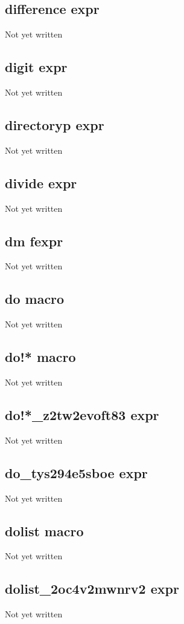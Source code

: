 \documentclass[a4paper,11pt]{article}
\begin{document}
\subsection{\ttfamily difference expr}
Not yet written

\subsection{\ttfamily digit expr}
Not yet written

\subsection{\ttfamily directoryp expr}
Not yet written

\subsection{\ttfamily divide expr}
Not yet written

\subsection{\ttfamily dm fexpr}
Not yet written

\subsection{\ttfamily do macro}
Not yet written

\subsection{\ttfamily do!* macro}
Not yet written

\subsection{\ttfamily do!*\_z2tw2evoft83 expr}
Not yet written

\subsection{\ttfamily do\_tys294e5sboe expr}
Not yet written

\subsection{\ttfamily dolist macro}
Not yet written

\subsection{\ttfamily dolist\_2oc4v2mwnrv2 expr}
Not yet written
\end{document}
